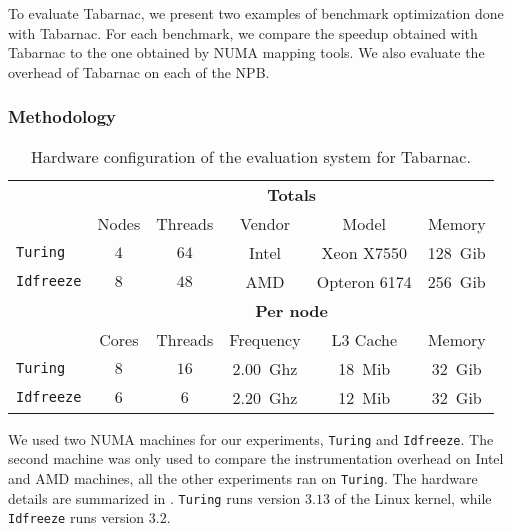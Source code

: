 
To evaluate \gls{Tabarnac}, we present two examples of benchmark optimization done with \gls{Tabarnac}.
For each benchmark, we compare the speedup obtained with \gls{Tabarnac} to the one obtained by \gls{NUMA} mapping tools.
We also evaluate the overhead of \gls{Tabarnac} on each of the \gls{NPB}.

\subsubsection{Methodology}


\begin{table}[htb]
    \centering
    \begin{tabular}{lccccc}
        \toprule
        & \multicolumn{5}{c}{\textbf{Totals}}\\
        \cmidrule(lr){2-6}
        & Nodes & Threads & Vendor & Model & Memory \\
        \cmidrule(lr){2-6}
        \texttt{Turing}   & $4$ & $64$ & Intel & Xeon X7550   & \SI{128}{Gib} \\
        \texttt{Idfreeze} & $8$ & $48$ & AMD   & Opteron 6174 & \SI{256}{Gib}\\
        \midrule
        & \multicolumn{5}{c}{\textbf{Per node}}\\
        \cmidrule(lr){2-6}
        & Cores & Threads & Frequency & L3 Cache & Memory \\
        \cmidrule(lr){2-6}
        \texttt{Turing}   & $8$ & $16$ & \SI{2.00}{Ghz}& \SI{18}{Mib} & \SI{32}{Gib} \\
        \texttt{Idfreeze} & $6$ & $6$  & \SI{2.20}{Ghz}& \SI{12}{Mib} & \SI{32}{Gib}\\
        \bottomrule
    \end{tabular}
    \caption{Hardware configuration of the evaluation system for Tabarnac.}
    \label{tab:turing-hw}
\end{table}

We used two NUMA machines for our experiments, \texttt{Turing} and \texttt{Idfreeze}.
The second machine was only used to compare the instrumentation overhead on Intel and AMD machines, all the other experiments ran on \texttt{Turing}.
The hardware details are summarized in .
\texttt{Turing} runs version $3.13$ of the Linux kernel, while \texttt{Idfreeze} runs version $3.2$.

